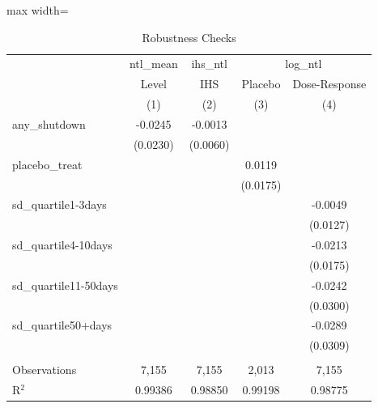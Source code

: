 
\begin{table}[htbp]
   \caption{\label{tab:robust} Robustness Checks}
   \bigskip
   \centering
   \begin{adjustbox}{max width=\textwidth}
\begin{tabular}{lcccc}
      \toprule
       & ntl\_mean & ihs\_ntl & \multicolumn{2}{c}{log\_ntl}\\
                              & Level         & IHS                   & Placebo       & Dose-Response \\   
                              & (1)           & (2)                   & (3)           & (4)\\  
      \midrule 
      any\_shutdown           & -0.0245       & -0.0013               &               &   \\   
                              & (0.0230)      & (0.0060)              &               &   \\   
      placebo\_treat          &               &                       & 0.0119        &   \\   
                              &               &                       & (0.0175)      &   \\   
      sd\_quartile1-3days     &               &                       &               & -0.0049\\   
                              &               &                       &               & (0.0127)\\   
      sd\_quartile4-10days    &               &                       &               & -0.0213\\   
                              &               &                       &               & (0.0175)\\   
      sd\_quartile11-50days   &               &                       &               & -0.0242\\   
                              &               &                       &               & (0.0300)\\   
      sd\_quartile50+days     &               &                       &               & -0.0289\\   
                              &               &                       &               & (0.0309)\\   
       \\
      Observations            & 7,155         & 7,155                 & 2,013         & 7,155\\  
      R$^2$                   & 0.99386       & 0.98850               & 0.99198       & 0.98775\\  

\end{tabular}
\end{adjustbox}
\end{table}
